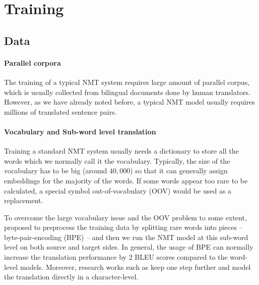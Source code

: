 
\section{Training}
\subsection{Data}
\paragraph{Parallel corpora} The training  of a typical NMT system requires large amount of parallel corpus, which is usually collected from bilingual documents done by human translators.  However, as we have already noted before, a typical NMT model usually requires millions of translated sentence pairs. 
\paragraph{Vocabulary and Sub-word level translation}  
Training a standard NMT system usually needs a dictionary to store all the words which we normally call it the vocabulary. Typically, the size of the vocabulary has to be big (around $40,000$) so that it can generally assign embeddings for the majority of the words. If some words appear too rare to be calculated, a special symbol out-of-vocabulary (OOV) would be used as a replacement. 

To overcome the large vocabulary issue and the OOV problem to some extent,  proposed to preprocess the training data by splitting rare words into pieces -- byte-pair-encoding (BPE) --  and then we run the NMT model at this sub-word level on both source and target sides. In general, the usage of BPE can normally increase the translation performance by $2$ BLEU scores compared to the word-level models. Moreover, research works such as  keep one step further and model the translation directly in a character-level.

